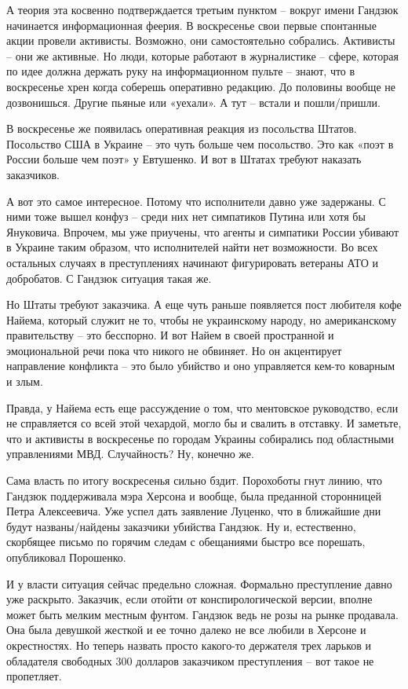 А теория эта косвенно подтверждается третьим пунктом – вокруг имени Гандзюк
начинается информационная феерия. В воскресенье свои первые спонтанные акции
провели активисты. Возможно, они самостоятельно собрались. Активисты – они же
активные. Но люди, которые работают в журналистике – сфере, которая по идее
должна держать руку на информационном пульте – знают, что в воскресенье хрен
когда соберешь оперативно редакцию. До половины вообще не дозвонишься. Другие
пьяные или «уехали». А тут – встали и пошли/пришли.

В воскресенье же появилась оперативная реакция из посольства Штатов. Посольство
США в Украине – это чуть больше чем посольство. Это как «поэт в России больше
чем поэт» у Евтушенко. И вот в Штатах требуют наказать заказчиков.

А вот это самое интересное. Потому что исполнители давно уже задержаны. С ними
тоже вышел конфуз – среди них нет симпатиков Путина или хотя бы Януковича.
Впрочем, мы уже приучены, что агенты и симпатики России убивают в Украине таким
образом, что исполнителей найти нет возможности. Во всех остальных случаях в
преступлениях начинают фигурировать ветераны АТО и добробатов. С Гандзюк
ситуация такая же.

Но Штаты требуют заказчика. А еще чуть раньше появляется пост любителя кофе
Найема, который служит не то, чтобы не украинскому народу, но американскому
правительству – это бесспорно. И вот Найем в своей пространной и эмоциональной
речи пока что никого не обвиняет. Но он акцентирует направление конфликта – это
было убийство и оно управляется кем-то коварным и злым.

Правда, у Найема есть еще рассуждение о том, что ментовское руководство, если
не справляется со всей этой чехардой, могло бы и свалить в отставку. И
заметьте, что и активисты в воскресенье по городам Украины собирались под
областными управлениями МВД. Случайность? Ну, конечно же.

Сама власть по итогу воскресенья сильно бздит. Порохоботы гнут линию, что
Гандзюк поддерживала мэра Херсона и вообще, была преданной сторонницей Петра
Алексеевича. Уже успел дать заявление Луценко, что в ближайшие дни будут
названы/найдены заказчики убийства Гандзюк. Ну и, естественно, скорбящее письмо
по горячим следам с обещаниями быстро все порешать, опубликовал Порошенко.

И у власти ситуация сейчас предельно сложная. Формально преступление давно уже
раскрыто. Заказчик, если отойти от конспирологической версии, вполне может быть
мелким местным фунтом. Гандзюк ведь не розы на рынке продавала. Она была
девушкой жесткой и ее точно далеко не все любили в Херсоне и окрестностях. Но
теперь назвать просто какого-то держателя трех ларьков и обладателя свободных
300 долларов заказчиком преступления – вот такое не пропетляет.

